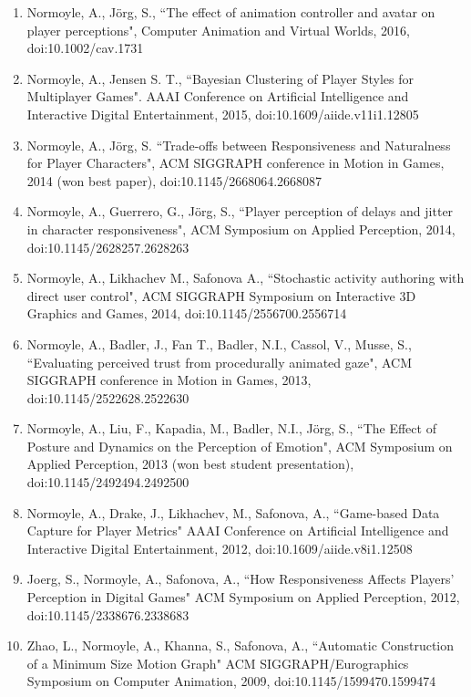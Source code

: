 \begin{enumerate}[leftmargin=*]
\item Normoyle, A., J\"{o}rg, S., ``The effect of animation controller and avatar on player perceptions", 
Computer Animation and Virtual Worlds, 2016, doi:10.1002/cav.1731

\item Normoyle, A., Jensen S. T., ``Bayesian Clustering of Player Styles for Multiplayer Games". AAAI Conference on Artificial Intelligence and Interactive Digital Entertainment, 2015, doi:10.1609/aiide.v11i1.12805 

\item Normoyle, A., J\"{o}rg, S. ``Trade-offs between Responsiveness and Naturalness for Player Characters", 
ACM SIGGRAPH conference in Motion in Games, 2014 (won best paper), doi:10.1145/2668064.2668087

\item Normoyle, A., Guerrero, G., J\"{o}rg, S., ``Player perception of delays and jitter in character responsiveness", 
ACM Symposium on Applied Perception, 2014, doi:10.1145/2628257.2628263

\item Normoyle, A., Likhachev M., Safonova A., ``Stochastic activity authoring with direct user control", 
ACM SIGGRAPH Symposium on Interactive 3D Graphics and Games, 2014, doi:10.1145/2556700.2556714

\item Normoyle, A., Badler, J., Fan T., Badler, N.I., Cassol, V., Musse, S., ``Evaluating perceived trust from procedurally animated gaze", ACM SIGGRAPH conference in Motion in Games, 2013, doi:10.1145/2522628.2522630

\item Normoyle, A., Liu, F., Kapadia, M., Badler, N.I., J\"{o}rg, S., ``The Effect of Posture and Dynamics on the Perception of Emotion", ACM Symposium on Applied Perception, 2013 (won best student presentation), doi:10.1145/2492494.2492500

\item Normoyle, A., Drake, J., Likhachev, M., Safonova, A., ``Game-based Data Capture for Player Metrics" 
AAAI Conference on Artificial Intelligence and Interactive Digital Entertainment, 2012, doi:10.1609/aiide.v8i1.12508 

\item Joerg, S., Normoyle, A., Safonova, A., ``How Responsiveness Affects Players' Perception in Digital Games" 
ACM Symposium on Applied Perception, 2012, doi:10.1145/2338676.2338683

\item Zhao, L., Normoyle, A., Khanna, S., Safonova, A., ``Automatic Construction of a Minimum Size Motion Graph" ACM SIGGRAPH/Eurographics Symposium on Computer Animation, 2009, doi:10.1145/1599470.1599474


\end{enumerate}
